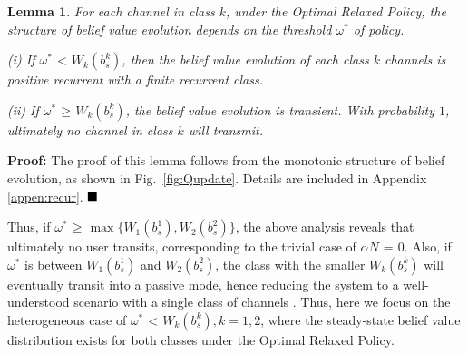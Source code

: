 \documentclass[11pt,twocolumn]{IEEEtran}
\newtheorem{lemma}{Lemma}
\begin{document}
\vspace{2pt}

\begin{lemma}
\label{lemma:pos_rec} For each channel in class $k$, under the
Optimal Relaxed Policy, the structure of belief value evolution
depends on the threshold $\omega^*$ of policy. \vspace{2pt}

\noindent(i) If $\omega^*\hspace{1pt}{<}\hspace{1pt}W_k(b^k_s)$, then the belief value evolution of each class $k$ channels is positive recurrent with a finite recurrent class.
\vspace{2pt}

\noindent(ii) If $\omega^* \hspace{1pt}{\geq}\hspace{1pt}W_k(b^k_s)$, the belief value evolution is transient. With probability $1$, ultimately no channel in class $k$ will transmit.
\end{lemma}

\noindent \textbf{Proof:} The proof of this lemma follows from the
monotonic structure of belief evolution, as shown in
Fig.~\ref{fig:Qupdate}. Details are included in Appendix
\ref{appen:recur}. $\hfill \blacksquare$ \vspace{3pt}

Thus, if $\omega^* \hspace{1pt}{\geq}\hspace{1pt} \max\{ W_1(b^1_s),
W_2(b^2_s)\}$, the above analysis reveals that ultimately no user
transits, corresponding to the trivial case of $\alpha
N\hspace{1pt}{=}\hspace{1pt}0$. Also, if $\omega^*$ is between
$W_1(b^1_s)$ and $W_2(b^2_s)$, the class with the smaller
$W_k(b^k_s)$ will eventually transit into a passive mode, hence
reducing the system to a well-understood scenario with a single class of channels \cite{Liu}\cite{Javidi}. Thus, here we focus on the
heterogeneous case of $\omega^* \hspace{1pt}{<}\hspace{1pt}
W_k(b^k_s), k{=}1,2$, where the steady-state belief value distribution
exists for both classes under the Optimal Relaxed Policy.
\end{document}

